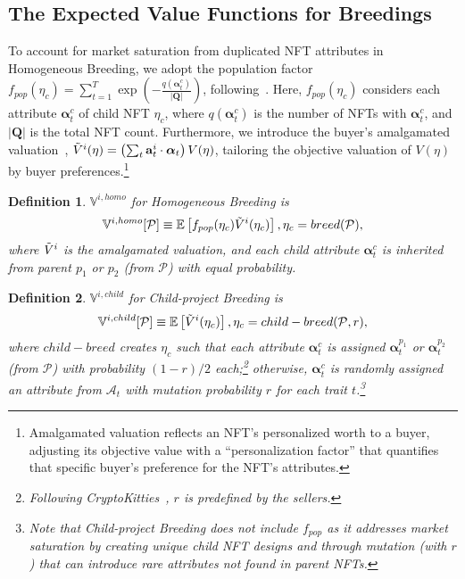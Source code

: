 \documentclass[conference]{IEEEtran}
\theoremstyle{plain}
\newtheorem{definition}{Definition}
\newcommand*{\defeq}{\equiv}
\begin{document}
\subsection{The Expected Value Functions for Breedings}
\label{subsec:expected-value-breeding}

To account for market saturation from duplicated NFT attributes in Homogeneous Breeding, we adopt the population factor $f_{pop}(\eta_c)=\sum_{t=1}^{T}\exp\left(-\frac{q(\bm{\alpha}^c_t)}{|\mathbf{Q}|}\right)$, following~\cite{mekacher2022heterogeneous}. Here, $f_{pop}(\eta_c)$ considers each attribute $\bm{\alpha}^c_t$ of child NFT $\eta_c$, where $q(\bm{\alpha}^c_t)$ is the number of NFTs with $\bm{\alpha}^c_t$, and $|\mathbf{Q}|$ is the total NFT count. Furthermore, we introduce the buyer's amalgamated valuation~\cite{mekacher2022heterogeneous, costa2023show}, $\Tilde{V}^i(\eta) = \left(\sum_t\mathbf{a}^{i}_t \cdot \bm{\alpha}_t \right)V(\eta)$, tailoring the objective valuation of $V(\eta)$ by buyer preferences.\footnote{Amalgamated valuation reflects an NFT's personalized worth to a buyer, adjusting its objective value with a ``personalization factor'' that quantifies that specific buyer's preference for the NFT's attributes.}

\begin{definition}
    \label{def:homogeneous-breeding}
    $\mathbb{V}^{i, homo}$ for Homogeneous Breeding is
    \begin{equation}\small
    \label{eqn:homob-utility}
     \mathbb{V}^{i, homo}[\mathcal{P}] \defeq \mathbb{E}\left[f_{pop}(\eta_c)\Tilde{V}^i(\eta_c)\right], \eta_c = breed(\mathcal{P}),
    \end{equation}
    where $\Tilde{V}^i$ is the amalgamated valuation, and each child attribute $\bm{\alpha}^c_t$ is inherited from parent $p_1$ or $p_2$ (from $\mathcal{P}$) with equal probability.
\end{definition}

\begin{definition}
    \label{def:child-project-breeding} 
    $\mathbb{V}^{i, child}$ for Child-project Breeding is
    \begin{equation}\small 
         \mathbb{V}^{i, child}[\mathcal{P}] \defeq \mathbb{E}\left[\Tilde{V}^i(\eta_c)\right], \eta_c = child-breed(\mathcal{P}, r),
    \end{equation} 
    where $child-breed$ creates $\eta_c$ such that each attribute $\bm{\alpha}^c_t$ is assigned $\bm{\alpha}^{p_1}_t$ or $\bm{\alpha}^{p_2}_t$ (from $\mathcal{P}$) with probability $(1-r)/2$ each;\footnote{Following CryptoKitties~\cite{cryptokitties}, $r$ is predefined by the sellers.} otherwise, $\bm{\alpha}^c_t$ is randomly assigned an attribute from $\mathcal{A}_t$ with mutation probability $r$ for each trait $t$.\footnote{Note that Child-project Breeding does not include $f_{pop}$ as it addresses market saturation by creating unique child NFT designs and through mutation (with $r$) that can introduce rare attributes not found in parent NFTs.}
\end{definition}
\end{document}
